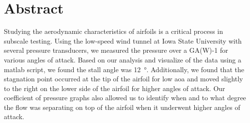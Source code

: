 \thispagestyle{plain} %



\chapter*{Abstract} %

Studying the aerodynamic characteristics of airfoils is a critical process in subscale testing. Using the low-speed wind tunnel at Iowa State University with several pressure transducers, we measured the pressure over a GA(W)-1 for various angles of attack. Based on our analysis and visualize of the data using a \acrfull{matlab} script, we found the stall angle was \qty{12}{\degree}. Additionally, we found that the stagnation point occurred at the tip of the airfoil for low \acrfull{aoa} and moved slightly to the right on the lower side of the airfoil for higher angles of attack. Our coefficient of pressure graphs also allowed us to identify when and to what degree the flow was separating on top of the airfoil when it underwent higher angles of attack. 



